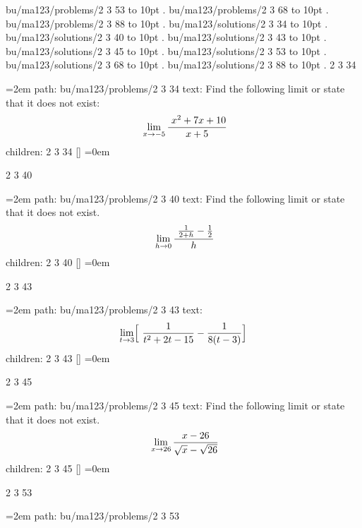 \smallskip
bu/ma123/problems/2 3 53 \leaders\hbox to 10pt {\hss.\hss}  \hfill {}
\smallskip
bu/ma123/problems/2 3 68 \leaders\hbox to 10pt {\hss.\hss}  \hfill {}
\smallskip
bu/ma123/problems/2 3 88 \leaders\hbox to 10pt {\hss.\hss}  \hfill {}
\smallskip
bu/ma123/solutions/2 3 34 \leaders\hbox to 10pt {\hss.\hss}  \hfill {}
\smallskip
bu/ma123/solutions/2 3 40 \leaders\hbox to 10pt {\hss.\hss}  \hfill {}
\smallskip
bu/ma123/solutions/2 3 43 \leaders\hbox to 10pt {\hss.\hss}  \hfill {}
\smallskip
bu/ma123/solutions/2 3 45 \leaders\hbox to 10pt {\hss.\hss}  \hfill {}
\smallskip
bu/ma123/solutions/2 3 53 \leaders\hbox to 10pt {\hss.\hss}  \hfill {}
\smallskip
bu/ma123/solutions/2 3 68 \leaders\hbox to 10pt {\hss.\hss}  \hfill {}
\smallskip
bu/ma123/solutions/2 3 88 \leaders\hbox to 10pt {\hss.\hss}  \hfill {}
\smallskip
\vfill \break
{}
2 3 34
\smallskip
\par\begingroup
\leftskip=2em
path: bu/ma123/problems/2 3 34
\smallskip
text:  Find the following limit or state that it does not exist: $$\ \lim_{x \to -5} {\ {x^2 + 7x + 10} \over {x + 5} } $$
\smallskip
children: 2 3 34 []
\smallskip
\leftskip=0em
\par\endgroup
\bigskip
{}
2 3 40
\smallskip
\par\begingroup
\leftskip=2em
path: bu/ma123/problems/2 3 40
\smallskip
text:  Find the following limit or state that it does not exist. $$\ \lim_{h \to 0} {\ {{1 \over 2 + h} - {1 \over 2}} \over h } $$
\smallskip
children: 2 3 40 []
\smallskip
\leftskip=0em
\par\endgroup
\bigskip
{}
2 3 43
\smallskip
\par\begingroup
\leftskip=2em
path: bu/ma123/problems/2 3 43
\smallskip
text:  $$\lim_{t \to 3} \Bigl[ {\ {1 \over t^2 + 2t - 15} - {1 \over 8(t - 3)} }\Bigr] $$
\smallskip
children: 2 3 43 []
\smallskip
\leftskip=0em
\par\endgroup
\bigskip
{}
2 3 45
\smallskip
\par\begingroup
\leftskip=2em
path: bu/ma123/problems/2 3 45
\smallskip
text:  Find the following limit or state that it does not exist. $$\ \lim_{x \to 26} { {x - 26} \over {\sqrt{x} - \sqrt{26}} } $$
\smallskip
children: 2 3 45 []
\smallskip
\leftskip=0em
\par\endgroup
\bigskip
{}
2 3 53
\smallskip
\par\begingroup
\leftskip=2em
path: bu/ma123/problems/2 3 53
